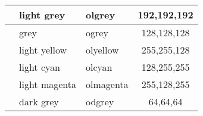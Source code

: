 \documentclass[a4paper,parskip=half,bibtotoc,11pt]{scrartcl}
\begin{document}
\begin{table}[H]
\begin{tabular}{|l|l|l|c|}
\cellcolor[RGB]{192,192,192} & light grey    & olgrey                  & 192,192,192    \\ \hline
\cellcolor[RGB]{128,128,128} & grey          & ogrey                   & 128,128,128    \\ \hline
\cellcolor[RGB]{255,255,128} & light yellow  & olyellow                & 255,255,128    \\ \hline
\cellcolor[RGB]{128,255,255} & light cyan    & olcyan                  & 128,255,255    \\ \hline
\cellcolor[RGB]{255,128,255} & light magenta & olmagenta               & 255,128,255    \\ \hline
\cellcolor[RGB]{64,64,64} & dark grey     & odgrey                  & 64,64,64    \\ \hline
\end{tabular}
\end{table}










    \cleardoublepage
    
    

\end{document}
